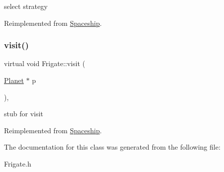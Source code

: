select strategy 

Reimplemented from \hyperlink{classSpaceship_a93be2d9d2b675ef978d866d4cd7a6524}{Spaceship}.

\mbox{\label{classFrigate_a20d3fd7cedff77da127e562bd2e7e015}} 
\subsubsection{\texorpdfstring{visit()}{visit()}}
{\footnotesize\ttfamily virtual void Frigate\+::visit (\begin{DoxyParamCaption}\item[{\hyperlink{classPlanet}{Planet} $\ast$}]{p }\end{DoxyParamCaption})\hspace{0.3cm}{\ttfamily [inline]}, {\ttfamily [virtual]}}

stub for visit 

Reimplemented from \hyperlink{classSpaceship}{Spaceship}.



The documentation for this class was generated from the following file\+:\begin{DoxyCompactItemize}
\item 
Frigate.\+h\end{DoxyCompactItemize}
